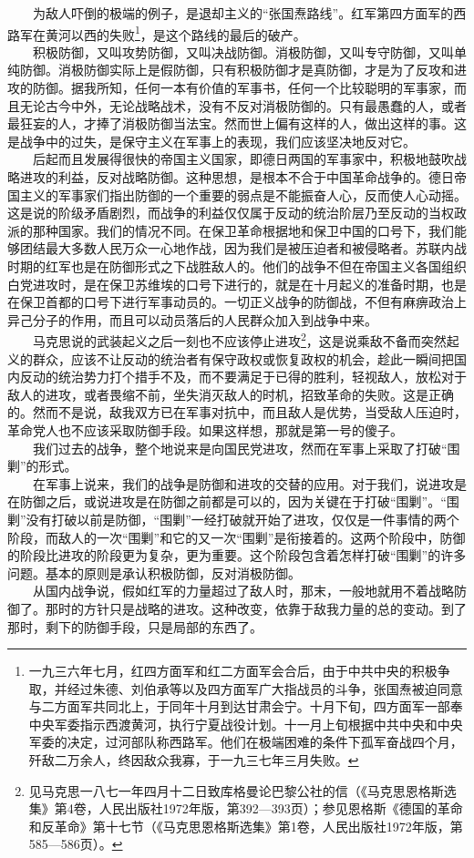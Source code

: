 \documentclass[cn,11pt,chinese]{elegantbook}
\begin{document}
　　为敌人吓倒的极端的例子，是退却主义的“张国焘路线”。红军第四方面军的西路军在黄河以西的失败\footnote[25]{ 一九三六年七月，红四方面军和红二方面军会合后，由于中共中央的积极争取，并经过朱德、刘伯承等以及四方面军广大指战员的斗争，张国焘被迫同意与二方面军共同北上，于同年十月到达甘肃会宁。十月下旬，四方面军一部奉中央军委指示西渡黄河，执行宁夏战役计划。十一月上旬根据中共中央和中央军委的决定，过河部队称西路军。他们在极端困难的条件下孤军奋战四个月，歼敌二万余人，终因敌众我寡，于一九三七年三月失败。}，是这个路线的最后的破产。\\
　　积极防御，又叫攻势防御，又叫决战防御。消极防御，又叫专守防御，又叫单纯防御。消极防御实际上是假防御，只有积极防御才是真防御，才是为了反攻和进攻的防御。据我所知，任何一本有价值的军事书，任何一个比较聪明的军事家，而且无论古今中外，无论战略战术，没有不反对消极防御的。只有最愚蠢的人，或者最狂妄的人，才捧了消极防御当法宝。然而世上偏有这样的人，做出这样的事。这是战争中的过失，是保守主义在军事上的表现，我们应该坚决地反对它。\\
　　后起而且发展得很快的帝国主义国家，即德日两国的军事家中，积极地鼓吹战略进攻的利益，反对战略防御。这种思想，是根本不合于中国革命战争的。德日帝国主义的军事家们指出防御的一个重要的弱点是不能振奋人心，反而使人心动摇。这是说的阶级矛盾剧烈，而战争的利益仅仅属于反动的统治阶层乃至反动的当权政派的那种国家。我们的情况不同。在保卫革命根据地和保卫中国的口号下，我们能够团结最大多数人民万众一心地作战，因为我们是被压迫者和被侵略者。苏联内战时期的红军也是在防御形式之下战胜敌人的。他们的战争不但在帝国主义各国组织白党进攻时，是在保卫苏维埃的口号下进行的，就是在十月起义的准备时期，也是在保卫首都的口号下进行军事动员的。一切正义战争的防御战，不但有麻痹政治上异己分子的作用，而且可以动员落后的人民群众加入到战争中来。\\
　　马克思说的武装起义之后一刻也不应该停止进攻\footnote[26]{ 见马克思一八七一年四月十二日致库格曼论巴黎公社的信（《马克思恩格斯选集》第4卷，人民出版社1972年版，第392—393页）；参见恩格斯《德国的革命和反革命》第十七节（《马克思恩格斯选集》第1卷，人民出版社1972年版，第585—586页）。}，这是说乘敌不备而突然起义的群众，应该不让反动的统治者有保守政权或恢复政权的机会，趁此一瞬间把国内反动的统治势力打个措手不及，而不要满足于已得的胜利，轻视敌人，放松对于敌人的进攻，或者畏缩不前，坐失消灭敌人的时机，招致革命的失败。这是正确的。然而不是说，敌我双方已在军事对抗中，而且敌人是优势，当受敌人压迫时，革命党人也不应该采取防御手段。如果这样想，那就是第一号的傻子。\\
　　我们过去的战争，整个地说来是向国民党进攻，然而在军事上采取了打破“围剿”的形式。\\
　　在军事上说来，我们的战争是防御和进攻的交替的应用。对于我们，说进攻是在防御之后，或说进攻是在防御之前都是可以的，因为关键在于打破“围剿”。“围剿”没有打破以前是防御，“围剿”一经打破就开始了进攻，仅仅是一件事情的两个阶段，而敌人的一次“围剿”和它的又一次“围剿”是衔接着的。这两个阶段中，防御的阶段比进攻的阶段更为复杂，更为重要。这个阶段包含着怎样打破“围剿”的许多问题。基本的原则是承认积极防御，反对消极防御。\\
　　从国内战争说，假如红军的力量超过了敌人时，那末，一般地就用不着战略防御了。那时的方针只是战略的进攻。这种改变，依靠于敌我力量的总的变动。到了那时，剩下的防御手段，只是局部的东西了。\\
\end{document}
